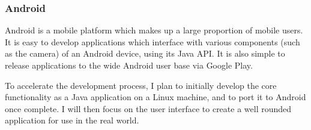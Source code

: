 \subsubsection{Android}

Android\cite{android} is a mobile platform which makes up a large proportion of mobile users. It is easy to develop applications which interface with various components (such as the camera) of an Android device, using its Java\cite{java} API. It is also simple to release applications to the wide Android user base via Google Play\cite{googleplay}.

To accelerate the development process, I plan to initially develop the core functionality as a Java application on a Linux machine, and to port it to Android once complete. I will then focus on the user interface to create a well rounded application for use in the real world.
